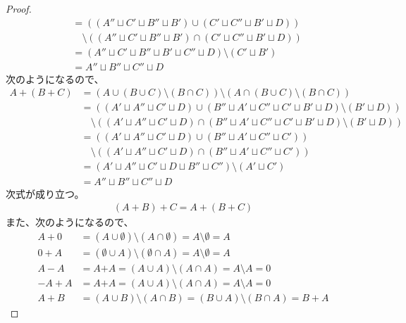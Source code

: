 \documentclass[dvipdfmx]{jsarticle}
\begin{document}
\begin{proof}
\begin{align*}
&= \left( \left( A'' \sqcup C' \sqcup B'' \sqcup B' \right) \cup \left( C' \sqcup C'' \sqcup B' \sqcup D \right) \right) \\
&\quad \setminus \left( \left( A'' \sqcup C' \sqcup B'' \sqcup B' \right) \cap \left( C' \sqcup C'' \sqcup B' \sqcup D \right) \right)\\
&= \left( A'' \sqcup C' \sqcup B'' \sqcup B' \sqcup C'' \sqcup D \right) \setminus \left( C' \sqcup B' \right)\\
&= A'' \sqcup B'' \sqcup C'' \sqcup D
\end{align*}
次のようになるので、
\begin{align*}
A + (B + C) &= \left( A \cup (B \cup C) \setminus (B \cap C) \right) \setminus \left( A \cap (B \cup C) \setminus (B \cap C) \right)\\
&= \left( \left( A' \sqcup A'' \sqcup C' \sqcup D \right) \cup \left( B'' \sqcup A' \sqcup C'' \sqcup C' \sqcup B' \sqcup D \right) \setminus \left( B' \sqcup D \right) \right) \\
&\quad \setminus \left( \left( A' \sqcup A'' \sqcup C' \sqcup D \right) \cap \left( B'' \sqcup A' \sqcup C'' \sqcup C' \sqcup B' \sqcup D \right) \setminus \left( B' \sqcup D \right) \right)\\
&= \left( \left( A' \sqcup A'' \sqcup C' \sqcup D \right) \cup \left( B'' \sqcup A' \sqcup C'' \sqcup C' \right) \right) \\
&\quad \setminus \left( \left( A' \sqcup A'' \sqcup C' \sqcup D \right) \cap \left( B'' \sqcup A' \sqcup C'' \sqcup C' \right) \right)\\
&= \left( A' \sqcup A'' \sqcup C' \sqcup D \sqcup B'' \sqcup C'' \right) \setminus \left( A' \sqcup C' \right)\\
&= A'' \sqcup B'' \sqcup C'' \sqcup D
\end{align*}
次式が成り立つ。
\begin{align*}
(A + B) + C = A + (B + C)
\end{align*}
また、次のようになるので、
\begin{align*}
A + 0 &= (A \cup \emptyset) \setminus (A \cap \emptyset) = A \setminus \emptyset = A\\
0 + A &= (\emptyset \cup A) \setminus (\emptyset \cap A) = A \setminus \emptyset = A\\
A - A &= A\text{+}A = (A \cup A) \setminus (A \cap A) = A \setminus A = 0\\
- A + A &= A\text{+}A = (A \cup A) \setminus (A \cap A) = A \setminus A = 0\\
A + B &= (A \cup B) \setminus (A \cap B) = (B \cup A) \setminus (B \cap A) = B + A

\end{align*}
\end{proof}
\end{document}

